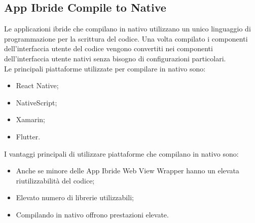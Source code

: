 \subsection{App Ibride Compile to Native}
Le applicazioni ibride che compilano in nativo utilizzano un unico linguaggio di programmazione per la scrittura del codice. Una volta compilato i componenti dell'interfaccia utente del codice vengono convertiti nei componenti dell'interfaccia utente nativi senza bisogno di configurazioni particolari.\\
Le principali piattaforme utilizzate per compilare in nativo sono:
\begin{itemize}
	\item React Native; 
	\item NativeScript; 
	\item Xamarin; 
	\item Flutter.
\end{itemize}
I vantaggi principali di utilizzare piattaforme che compilano in nativo sono:
\begin{itemize}
	\item Anche se minore delle App Ibride Web View Wrapper hanno un elevata riutilizzabilità del codice; 
	\item Elevato numero di librerie utilizzabili;  
	\item Compilando in nativo offrono prestazioni elevate.
\end{itemize}
\newpage
